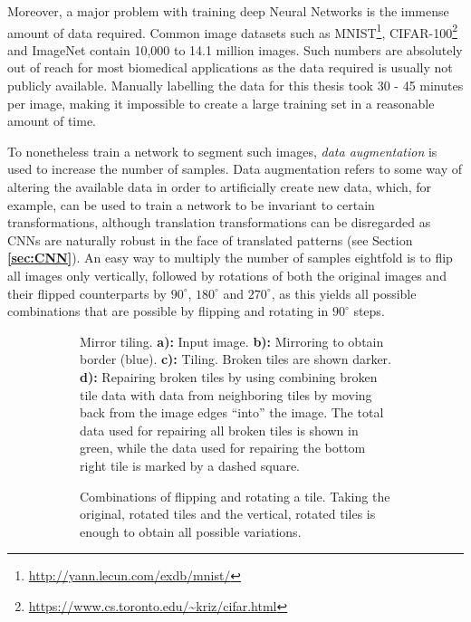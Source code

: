 \noindent Moreover, a major problem with training deep Neural Networks is the immense amount of data required. Common image datasets such as MNIST\footnote{\url{http://yann.lecun.com/exdb/mnist/}}, CIFAR-100\footnote{\url{https://www.cs.toronto.edu/~kriz/cifar.html}} and ImageNet \cite{ILSVRC} contain 10,000 to 14.1 million images. Such numbers are absolutely out of reach for most biomedical applications as the data required is usually not publicly available. Manually labelling the data for this thesis took 30 - 45 minutes per image, making it impossible to create a large training set in a reasonable amount of time.

To nonetheless train a network to segment such images, \textit{data augmentation} is used to increase the number of samples. Data augmentation refers to some way of altering the available data in order to artificially create new data, which, for example, can be used to train a network to be invariant to certain transformations, although translation transformations can be disregarded as CNNs are naturally robust in the face of translated patterns (see Section \textbf{\ref{sec:CNN}}). An easy way to multiply the number of samples eightfold is to flip all images only vertically, followed by rotations of both the original images and their flipped counterparts by $90^{\circ}$, $180^{\circ}$ and $270^{\circ}$, as this yields all possible combinations that are possible by flipping and rotating in $90^{\circ}$ steps.\\


\begin {figure}[!ht]
	\begin {subfigure}[t]{0.5\linewidth}
		\scalebox{0.5}{}

		\caption*{Mirror tiling. \textbf{a):} Input image. \textbf{b):} Mirroring to obtain border (blue). \textbf{c):} Tiling. Broken tiles are shown darker. \textbf{d):} Repairing broken tiles by using combining broken tile data with data from neighboring tiles by moving back from the image edges ``into'' the image. The total data used for repairing all broken tiles is shown in green, while the data used for repairing the bottom right tile is marked by a dashed square.}
	\end {subfigure}
	\hspace{1cm}
	\begin {subfigure}[t]{0.5\linewidth}
		\scalebox{0.5}{}

		\caption*{Combinations of flipping and rotating a tile. Taking the original, rotated tiles and the vertical, rotated tiles is enough to obtain all possible variations.}
	\end {subfigure}

		\caption[]{}
		\label{fig:tile_mirror_rotate}

\end {figure}


